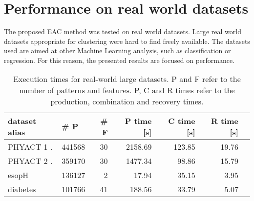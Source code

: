 \section{Performance on real world datasets}

The proposed EAC method was tested on real world datasets.
Large real world datasets appropriate for clustering were hard to find freely available.
The datasets used are aimed at other Machine Learning analysis, such as classification or regression.
For this reason, the presented results are focused on performance.

\begin{table}[h]
\centering
\caption{Execution times for real-world large datasets. P and F refer to the number of patterns and features. P, C and R times refer to the production, combination and recovery times.}

\begin{tabular}{llrrrrr}
\toprule
dataset alias &  \# P &  \# F &  P time [s] &  C time [s] &  R time [s] \\
\midrule
PHYACT 1 \cite{Lichman:2013}.&              441568 &                  30 &      2158.69 &        123.85 &      19.76 \\
PHYACT 2 \cite{Lichman:2013}.&              359170 &                  30 &      1477.34 &         98.86 &      15.79 \\
esopH \cite{yuk13oro}        &                 136127 &                   2 &        17.94 &  35.15 &       3.95 \\
diabetes \cite{strack2014impact,Lichman:2013}&              101766 &                  41 &       188.56 &  33.79 &       5.07 \\
\bottomrule
\end{tabular}


\label{tab:eac rules}
\end{table}